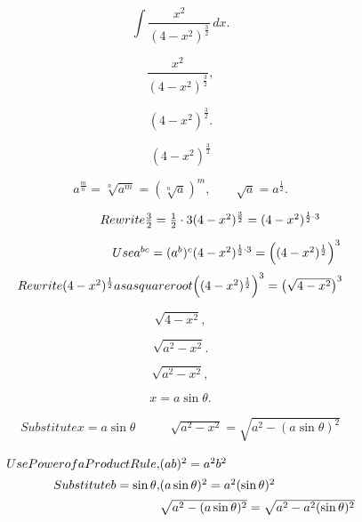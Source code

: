 \documentclass{article}
\begin{document}

\[
\displaystyle\int \frac{x^2}{(4-x^2)^{\frac{3}{2}}}\, dx.
\]

\[
\frac{x^2}{(4-x^2)^\frac{3}{2}},
\]

\[
(4-x^2)^{\frac{3}{2}}.
\]

\[
(4-x^2)^{\frac{3}{2}}
\]

\[
a^{\frac{m}{n}}=\sqrt[n]{a^m}=\left(\sqrt[n]{a}\right)^m,\qquad \sqrt{a} =a^{\frac{1}{2}}.
\]

\[
\begin{array}{@{}r@{}l@{}}
 Rewrite \frac{3}{2}=\frac{1}{2}\cdot 3
 &
 (4-x^2)^{\frac{3}{2}}
 = (4-x^2)^{\frac{1}{2}\cdot 3}
 \\[2.2ex]
 Use a^{bc}=(a^b)^c
 &
 (4-x^2)^{\frac{1}{2}\cdot 3}
 =
 \left((4-x^2)^{\frac{1}{2}}\right)^3
 \\[2.2ex]
 Rewrite (4-x^2)^{\frac{1}{2}} as a square root &
 \left((4-x^2)^{\frac{1}{2}}\right)^3
 =
 \left(\sqrt{4-x^2}\right)^3
 \end{array}
\]

\[
\sqrt{4-x^2},
\]

\[
\sqrt{a^2-x^2}.
\]

\[
\sqrt{a^2-x^2},
\]

\[
x=a\sin\theta.
\]

\[
\begin{aligned}
 Substitute x=a\sin\theta
 \qquad &
 \sqrt{a^2-x^2}
 =
 \sqrt{a^2-(a\sin\theta)^2}
 \end{aligned}
\]

\[
\begin{array}{@{}r@{}l@{}}
 Use Power of a Product Rule , &
 (a b )^2=a^2 b ^2
 \\[1.2ex]
 Substitute b=\sin\theta,
 &
 (a \sin\theta )^2=a^2( \sin\theta )^2
 \\[1.2ex]
 &
 \sqrt{a^2- (a\sin\theta)^2 }
 = \sqrt{a^2- a^2(\sin\theta)^2 }
 \end{array}
\]
\end{document}
